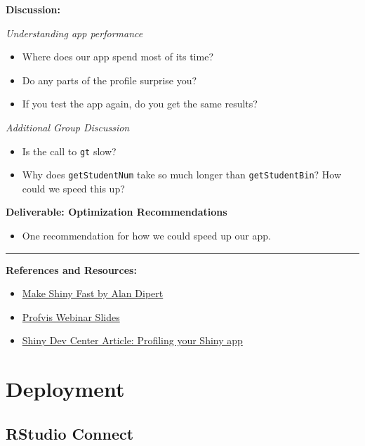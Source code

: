 \documentclass[]{book}
\providecommand{\tightlist}{%
  \setlength{\itemsep}{0pt}\setlength{\parskip}{0pt}}
\theoremstyle{definition}
\theoremstyle{definition}
\theoremstyle{definition}
\theoremstyle{remark}
\begin{document}
\textbf{Discussion:}

\emph{Understanding app performance}

\begin{itemize}
\tightlist
\item
  Where does our app spend most of its time?
\item
  Do any parts of the profile surprise you?
\item
  If you test the app again, do you get the same results?
\end{itemize}

\emph{Additional Group Discussion}

\begin{itemize}
\tightlist
\item
  Is the call to \texttt{gt} slow?
\item
  Why does \texttt{getStudentNum} take so much longer than
  \texttt{getStudentBin}? How could we speed this up?
\end{itemize}

\textbf{Deliverable: Optimization Recommendations}

\begin{itemize}
\tightlist
\item
  One recommendation for how we could speed up our app.
\end{itemize}

\begin{center}\rule{0.5\linewidth}{\linethickness}\end{center}

\textbf{References and Resources:}

\begin{itemize}
\tightlist
\item
  \href{https://tailrecursion.com/slides/fast-shiny/\#/title-slide}{Make
  Shiny Fast by Alan Dipert}
\item
  \href{https://github.com/rstudio/webinars/blob/master/26-Profiling/Profiling.pdf}{Profvis
  Webinar Slides}
\item
  \href{http://shiny.rstudio.com/articles/profiling.html}{Shiny Dev
  Center Article: Profiling your Shiny app}
\end{itemize}

\hypertarget{deployment}{%
\chapter{Deployment}\label{deployment}}

\hypertarget{rstudio-connect}{%
\section{RStudio Connect}\label{rstudio-connect}}
\end{document}

